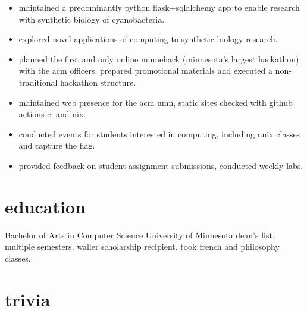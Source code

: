 \documentclass{moderncv}
\begin{document}
{
  \begin{itemize}[label=\rightarrow,noitemsep]
  \item maintained a predominantly python flask+sqlalchemy app to enable research with synthetic biology of cyanobacteria.
  \item explored novel applications of computing to synthetic biology research.
  \end{itemize}
}
  
{
  \begin{itemize}[label=\rightarrow,noitemsep]
  \item planned the first and only online minnehack (minnesota's largest hackathon) with the acm officers. prepared promotional materials and executed a non-traditional hackathon structure.
  \item maintained web presence for the acm umn, static sites checked with github actions ci and nix.
  \item conducted events for students interested in computing, including unix classes and capture the flag.
  \end{itemize}
}

{
  \begin{itemize}[label=\rightarrow,noitemsep]
  \item provided feedback on student assignment submissions, conducted weekly labs.
  \end{itemize}
}

\section{education}
{Bachelor of Arts in Computer Science}
{University of Minnesota}
{}{}
{
  dean's list, multiple semesters. waller scholarship recipient. took french and philosophy classes.
}


\section{trivia}
\end{document}
